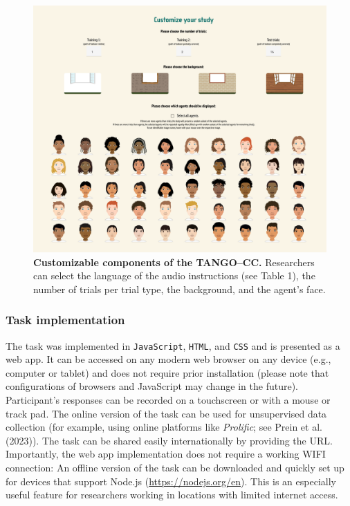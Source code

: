 \documentclass[
  man,floatsintext]{apa7}
\begin{document}
\begin{figure}

{\centering \includegraphics[width=1\linewidth]{../figures/tango-cc-screenshot} 

}

\caption{\textbf{Customizable components of the TANGO--CC.} Researchers can select the language of the audio instructions (see Table 1), the number of trials per trial type, the background, and the agent's face.}\label{fig:fig2}
\end{figure}

\subsubsection{Task implementation}\label{task-implementation}

The task was implemented in \texttt{JavaScript}, \texttt{HTML}, and \texttt{CSS} and is presented as a web app.
It can be accessed on any modern web browser on any device (e.g., computer or tablet) and does not require prior installation (please note that configurations of browsers and JavaScript may change in the future).
Participant's responses can be recorded on a touchscreen or with a mouse or track pad.
The online version of the task can be used for unsupervised data collection (for example, using online platforms like \emph{Prolific}; see Prein et al. (2023)). The task can be shared easily internationally by providing the URL.
Importantly, the web app implementation does not require a working WIFI connection: An offline version of the task can be downloaded and quickly set up for devices that support Node.js (\url{https://nodejs.org/en}).
This is an especially useful feature for researchers working in locations with limited internet access.
\end{document}
